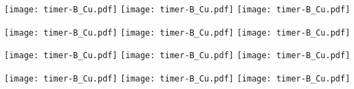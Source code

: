 \documentclass[12pt,a4paper,final]{letter}
\begin{document}
\pagestyle{fancy}
{\texttt{[image: timer-B\_Cu.pdf]}}
\hspace{2.0cm}
{\texttt{[image: timer-B\_Cu.pdf]}}
\hspace{2.0cm}
{\texttt{[image: timer-B\_Cu.pdf]}}

\vspace{2.0cm}
{\texttt{[image: timer-B\_Cu.pdf]}}
\hspace{2.0cm}
{\texttt{[image: timer-B\_Cu.pdf]}}
\hspace{2.0cm}
{\texttt{[image: timer-B\_Cu.pdf]}}

\vspace{2.0cm}
{\texttt{[image: timer-B\_Cu.pdf]}}
\hspace{2.0cm}
{\texttt{[image: timer-B\_Cu.pdf]}}
\hspace{2.0cm}
{\texttt{[image: timer-B\_Cu.pdf]}}

\vspace{2.0cm}
{\texttt{[image: timer-B\_Cu.pdf]}}
\hspace{2.0cm}
{\texttt{[image: timer-B\_Cu.pdf]}}
\hspace{2.0cm}
{\texttt{[image: timer-B\_Cu.pdf]}}
\end{document}
